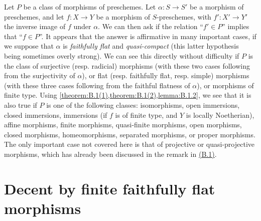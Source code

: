 \documentclass{article}
\theoremstyle{plain}
\theoremstyle{definition}
\newcommand{\oldpage}[1]{\marginpar{\footnotesize$\Big\vert$ \textit{p.~#1}}}
\begin{document}
Let $P$ be a class of morphisms of preschemes.
Let $\alpha\colon S\to S'$ be a morphism of preschemes, and let $f\colon X\to Y$ be a morphism of $S$-preschemes, with $f'\colon X'\to Y'$ the inverse image of $f$ under $\alpha$.
We can then ask if the relation ``$f'\in P$'' implies that ``$f\in P$''.
It appears that the answer is affirmative in many important cases, if we suppose that $\alpha$ is \emph{faithfully flat} and \emph{quasi-compact} (this latter hypothesis being sometimes overly strong).
We can see this directly without difficulty if $P$ is the class of surjective (resp. radicial) morphisms (with these two cases following from the surjectivity of $\alpha$), or flat (resp. faithfully flat, resp. simple) morphisms (with these three cases following from the faithful flatness of $\alpha$), or morphisms of finite type.
Using \cref{theorem:B.1(1),theorem:B.1(2),lemma:B.1.2}, we see that it is also true if $P$ is one of the following classes:
isomorphisms, open immersions, closed immersions, immersions (if $f$ is of finite type, and $Y$ is locally Noetherian), affine morphisms, finite morphisms, quasi-finite morphisms, open morphisms, closed morphisms, homeomorphisms, separated morphisms,
\oldpage{190-21}
or proper morphisms.
The only important case not covered here is that of projective or quasi-projective morphisms, which has already been discussed in the remark in \hyperref[B.1]{(B.1)}.


\section{Decent by finite faithfully flat morphisms}
\label{B.3}
\end{document}
